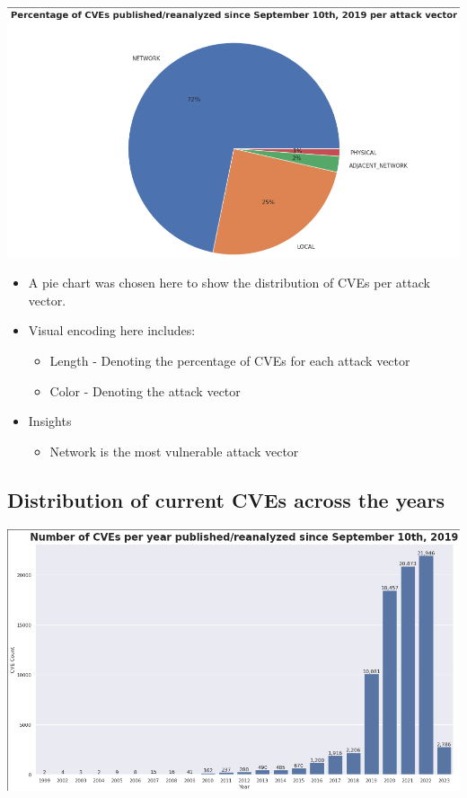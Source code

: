 \documentclass[a4paper, 11pt]{article}
\begin{document}
\begin{center}
\includegraphics[width=.9\linewidth]{./charts/cve_attack_vector.png}
\end{center}

\begin{itemize}
\item A pie chart was chosen here to show the distribution of CVEs per attack vector.
\item Visual encoding here includes:
\begin{itemize}
\item Length - Denoting the percentage of CVEs for each attack vector
\item Color - Denoting the attack vector
\end{itemize}
\item Insights
\begin{itemize}
\item Network is the most vulnerable attack vector
\end{itemize}
\end{itemize}
\subsection{Distribution of current CVEs across the years}
\label{sec:org7b3991c}

\begin{center}
\includegraphics[width=.9\linewidth]{./charts/cve_year.png}
\end{center}
\end{document}
